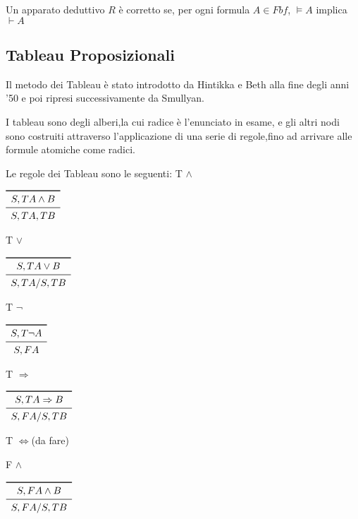 \begin{thm}
    Un apparato deduttivo $R$ è corretto se, per ogni formula $A \in Fbf$, $\models A$
    implica $\vdash A$
\end{thm}
\subsection{Tableau Proposizionali}
Il metodo dei Tableau è stato introdotto da Hintikka e Beth alla fine degli anni '50
e poi ripresi successivamente da Smullyan.

I tableau sono degli alberi,la cui radice è l'enunciato in esame, e gli altri nodi
sono costruiti attraverso l'applicazione di una serie di regole,fino ad arrivare
alle formule atomiche come radici.

Le regole dei Tableau sono le seguenti:\newline
T $\land$

$\begin{array}{c}
\toprule
S,T A \land B \\
\midrule
S, TA, TB \\
\end{array}$

T $\lor$

$\begin{array}{c}
\toprule
S,T A \lor B \\
\midrule
S, TA/ S, TB \\
\end{array}$

T $\neg$

$\begin{array}{c}
\toprule
S,T \neg A \\
\midrule
S, FA \\
\end{array}$

T $\Rightarrow$

$\begin{array}{c}
\toprule
S,T A \Rightarrow B \\
\midrule
S, FA / S, TB \\
\end{array}$

T $\iff$(da fare)

F $\land$

$\begin{array}{c}
\toprule
S,F A \land B \\
\midrule
S, FA/ S, TB \\
\end{array}$

